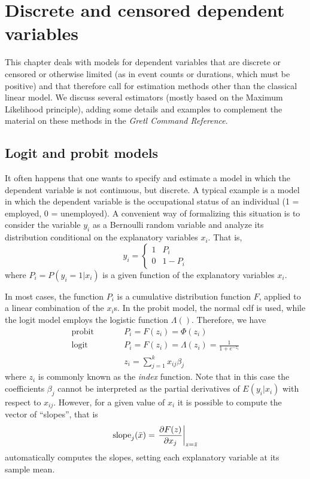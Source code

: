\chapter{Discrete and censored dependent variables}
\label{chap:discr-models}

This chapter deals with models for dependent variables that are
discrete or censored or otherwise limited (as in event counts or
durations, which must be positive) and that therefore call for
estimation methods other than the classical linear model. We discuss
several estimators (mostly based on the Maximum Likelihood principle),
adding some details and examples to complement the material on
these methods in the \emph{Gretl Command Reference}.

\section{Logit and probit models}
\label{sec:logit-probit}

It often happens that one wants to specify and estimate a model in
which the dependent variable is not continuous, but discrete. A
typical example is a model in which the dependent variable is the
occupational status of an individual (1 = employed, 0 = unemployed). A
convenient way of formalizing this situation is to consider the
variable $y_i$ as a Bernoulli random variable and analyze its
distribution conditional on the explanatory variables $x_i$.  That is,
%
\begin{equation}
  \label{eq:qr-Bernoulli}
  y_i = \left\{ 
    \begin{array}{ll} 
      1 & P_i \\ 0 & 1 - P_i 
    \end{array}
    \right.
\end{equation}
%
where $P_i = P(y_i = 1 | x_i) $ is a given function of the explanatory
variables $x_i$.

In most cases, the function $P_i$ is a cumulative distribution
function $F$, applied to a linear combination of the $x_i$s. In the
probit model, the normal cdf is used, while the logit model employs
the logistic function $\Lambda()$. Therefore, we have
%
\begin{eqnarray}
  \label{eq:qr-link}
  \textrm{probit} & \qquad & P_i = F(z_i) = \Phi(z_i)  \\
  \textrm{logit}  & \qquad & P_i = F(z_i) = \Lambda(z_i) = \frac{1}{1 + e^{-z_i}} \\
  & &z_i = \sum_{j=1}^k x_{ij} \beta_j
\end{eqnarray}
%
where $z_i$ is commonly known as the \emph{index} function. Note that
in this case the coefficients $\beta_j$ cannot be interpreted as the
partial derivatives of $E(y_i | x_i)$ with respect to
$x_{ij}$.  However, for a given value of $x_i$ it is possible to
compute the vector of ``slopes'', that is
\[
  \mathrm{slope}_j(\bar{x}) = \left. \frac{\partial F(z)}{\partial x_j} \right|_{z =
    \bar{z}}
\]
 automatically computes the slopes, setting each
explanatory variable at its sample mean.

